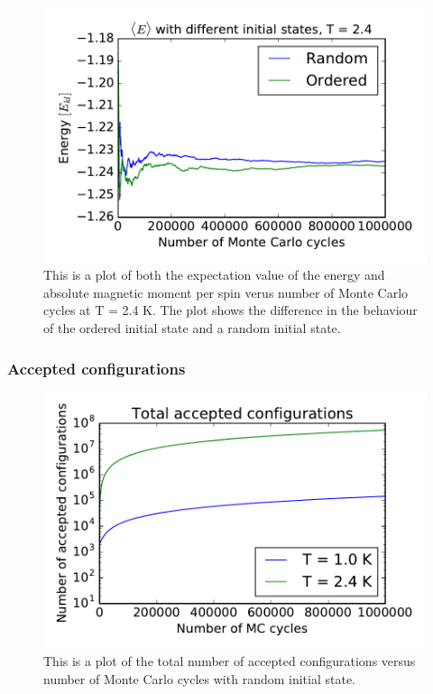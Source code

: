 \begin{figure}[H]
\includegraphics[width=\linewidth]{../results/4c/ran_order_T2}\caption{This is a plot of both the expectation value of the energy and absolute magnetic moment per spin verus number of Monte Carlo cycles at T = 2.4 K. The plot shows the difference in the behaviour of the ordered initial state and a random initial state.}\label{fig:L_20_initial_T_2.4}
\end{figure}

\subsubsection{Accepted configurations}

\begin{figure}[H]
\includegraphics[width=\linewidth]{../results/4c/L_20_total_accepted}\caption{This is a plot of the total number of accepted configurations versus number of Monte Carlo cycles with random initial state.}\label{fig:total_accepted}
\end{figure}

